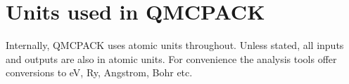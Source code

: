 \chapter{Units used in QMCPACK}
\label{sec:units}

Internally, QMCPACK uses atomic units throughout. Unless stated, all inputs and outputs are also in atomic units. For convenience the analysis tools offer conversions to eV, Ry, Angstrom, Bohr etc.

